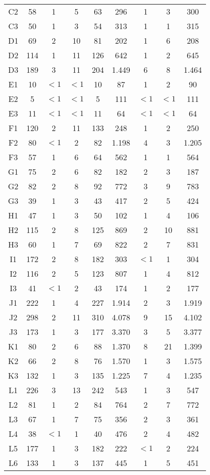 \begin{center}
\begin{longtable}{ccccc|cccc}
C2&58&1&5&63&296&1&3&300\\
C3&50&1&3&54&313&1&1&315\\
D1&69&2&10&81&202&1&6&208\\
D2&114&1&11&126&642&1&2&645\\
D3&189&3&11&204&1.449&6&8&1.464\\
E1&10&$<1$&$<1$&10&87&1&2&90\\
E2&5&$<1$&$<1$&5&111&$<1$&$<1$&111\\
E3&11&$<1$&$<1$&11&64&$<1$&$<1$&64\\
F1&120&2&11&133&248&1&2&250\\
F2&80&$<1$&2&82&1.198&4&3&1.205\\
F3&57&1&6&64&562&1&1&564\\
G1&75&2&6&82&182&2&3&187\\
G2&82&2&8&92&772&3&9&783\\
G3&39&1&3&43&417&2&5&424\\
H1&47&1&3&50&102&1&4&106\\
H2&115&2&8&125&869&2&10&881\\
H3&60&1&7&69&822&2&7&831\\
I1&172&2&8&182&303&$<1$&1&304\\
I2&116&2&5&123&807&1&4&812\\
I3&41&$<1$&2&43&174&1&2&177\\
J1&222&1&4&227&1.914&2&3&1.919\\
J2&298&2&11&310&4.078&9&15&4.102\\
J3&173&1&3&177&3.370&3&5&3.377\\
K1&80&2&6&88&1.370&8&21&1.399\\
K2&66&2&8&76&1.570&1&3&1.575\\
K3&132&1&3&135&1.225&7&4&1.235\\
L1&226&3&13&242&543&1&3&547\\
L2&81&1&2&84&764&2&7&772\\
L3&67&1&7&75&356&2&3&361\\
L4&38&$<1$&1&40&476&2&4&482\\
L5&177&1&3&182&222&$<1$&2&224\\
L6&133&1&3&137&445&1&5&451\\
\end{longtable}
\end{center}

